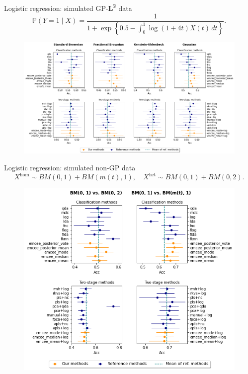 \documentclass[9pt, english, professionalfonts]{beamer}
\renewcommand{\P} {\ensuremath{\mathds{P}}}
\begin{document}
\begin{frame}{Logistic regression: simulated GP-\(\bm{L^2}\) data}
  \[
  \P(Y=1\mid X) = \frac{1}{\displaystyle 1 + \exp\left\{0.5 - \int_0^1 \log(1+4t) X(t)\, dt\right\}}.
  \]
  \begin{figure}
    \includegraphics[width=.95\textwidth]{clf_emcee_l2}
  \end{figure}
\end{frame}

\begin{frame}{Logistic regression: simulated non-GP data}
  \[
  X^{\text{hom}} \sim BM(0, 1) + BM(m(t), 1), \quad X^{\text{het}} \sim BM(0, 1) + BM(0, 2).
  \]
  \begin{figure}
    \includegraphics[width=.6\textwidth]{clf_emcee_nongp}
  \end{figure}
\end{frame}
\end{document}
